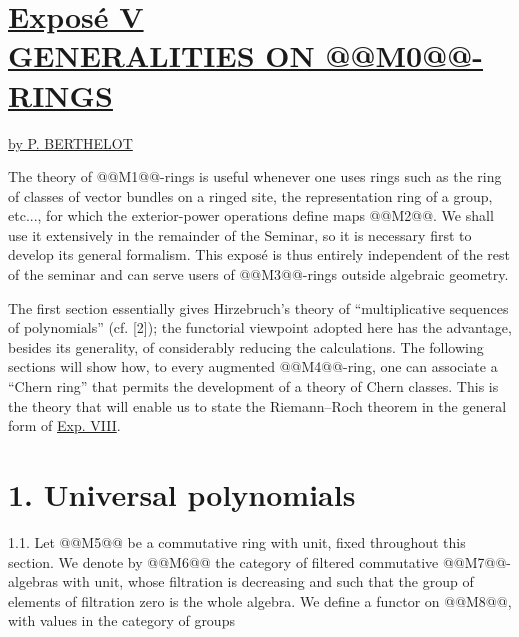 \renewcommand{\parf}{\operatorname{parf}}
\section*{\underline{Exposé V}\\[3pt] \underline{\underline{GENERALITIES ON @@M0@@-RINGS}}}
\begin{center}
\underline{by P. BERTHELOT}
\end{center}

The theory of @@M1@@-rings is useful whenever one uses rings such as the ring of classes of vector bundles on a ringed site, the representation ring of a group, etc..., for which the exterior-power operations define maps @@M2@@. We shall use it extensively in the remainder of the Seminar, so it is necessary first to develop its general formalism. This exposé is thus entirely independent of the rest of the seminar and can serve users of @@M3@@-rings outside algebraic geometry.

The first section essentially gives Hirzebruch's theory of ``multiplicative sequences of polynomials'' (cf. [2]); the functorial viewpoint adopted here has the advantage, besides its generality, of considerably reducing the calculations. The following sections will show how, to every augmented @@M4@@-ring, one can associate a ``Chern ring'' that permits the development of a theory of Chern classes. This is the theory that will enable us to state the Riemann--Roch theorem in the general form of \hyperlink{sga6.e08.expose}{Exp. VIII}.

\section*{1. Universal polynomials}

1.1. Let @@M5@@ be a commutative ring with unit, fixed throughout this section. We denote by @@M6@@ the category of filtered commutative @@M7@@-algebras with unit, whose filtration is decreasing and such that the group of elements of filtration zero is the whole algebra. We define a functor on @@M8@@, with values in the category of groups
